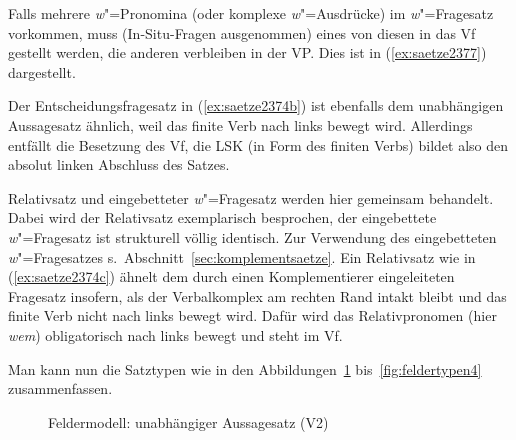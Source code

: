 Falls mehrere \textit{w}"=Pronomina (oder komplexe \textit{w}"=Ausdrücke) im \textit{w}"=Fragesatz vorkommen, muss (In-Situ-Fragen ausgenommen) eines von diesen in das Vf gestellt werden, die anderen verbleiben in der VP.
Dies ist in (\ref{ex:saetze2377}) dargestellt.

\begin{exe}
  \ex\label{ex:saetze2377}
  \begin{xlist}
  \end{xlist}
\end{exe}

Der Entscheidungsfragesatz in (\ref{ex:saetze2374b}) ist ebenfalls dem unabhängigen Aussagesatz ähnlich, weil das finite Verb nach links bewegt wird.
Allerdings entfällt die Besetzung des Vf, die LSK (in Form des finiten Verbs) bildet also den absolut linken Abschluss des Satzes.


Relativsatz und eingebetteter \textit{w}"=Fragesatz werden hier gemeinsam behandelt.
Dabei wird der Relativsatz exemplarisch besprochen, der eingebettete \textit{w}"=Fragesatz ist strukturell völlig identisch.
Zur Verwendung des eingebetteten \textit{w}"=Fragesatzes s.\ Abschnitt~\ref{sec:komplementsaetze}.
Ein Relativsatz wie in (\ref{ex:saetze2374c}) ähnelt dem durch einen Komplementierer eingeleiteten Fragesatz insofern, als der Verbalkomplex am rechten Rand intakt bleibt und das finite Verb nicht nach links bewegt wird.
Dafür wird das Relativpronomen (hier \textit{wem}) obligatorisch nach links bewegt und steht im Vf.

Man kann nun die Satztypen wie in den Abbildungen~\ref{fig:feldertypen1} bis~\ref{fig:feldertypen4} zusammenfassen.

\begin{figure}[h]
  \caption{Feldermodell: unabhängiger Aussagesatz (V2)}
  \label{fig:feldertypen1}
\end{figure}

